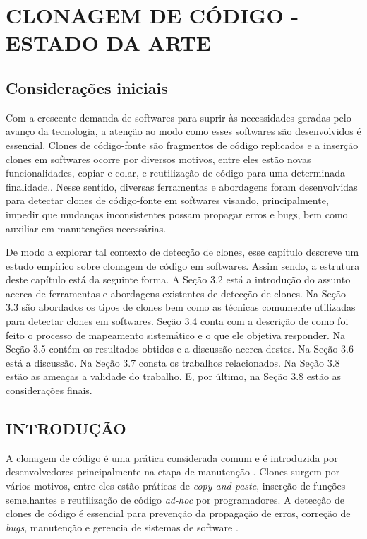\chapter{CLONAGEM DE CÓDIGO - ESTADO DA ARTE}

\section{Considerações iniciais}

Com a crescente demanda de softwares para suprir às necessidades geradas pelo avanço da tecnologia, a atenção ao modo como esses softwares são desenvolvidos é essencial. Clones de código-fonte são fragmentos de código replicados e a inserção clones em softwares ocorre por diversos motivos, entre eles estão novas funcionalidades, copiar e colar, e reutilização de código para uma determinada finalidade\cite{solanki2016comparative}.. Nesse sentido, diversas ferramentas e abordagens foram desenvolvidas para detectar clones de código-fonte em softwares visando, principalmente, impedir que mudanças inconsistentes possam  propagar erros e bugs, bem como auxiliar em manutenções necessárias. 

De modo a explorar tal contexto de detecção de clones, esse capítulo descreve um estudo empírico sobre clonagem de código em softwares. Assim sendo, a estrutura deste capítulo está da seguinte forma. A Seção 3.2 está a introdução do assunto acerca de ferramentas e abordagens existentes de detecção de clones. Na Seção 3.3 são abordados os tipos de clones bem como as técnicas comumente utilizadas para detectar clones em softwares. Seção 3.4 conta com a descrição de como foi feito o processo de mapeamento sistemático e o que ele objetiva responder. Na Seção 3.5 contém os resultados obtidos e a discussão acerca destes. Na Seção 3.6 está a discussão. Na Seção 3.7 consta os trabalhos relacionados. Na Seção 3.8 estão as ameaças a validade do trabalho. E, por último, na Seção 3.8 estão as considerações finais. 

\section{INTRODUÇÃO}
A clonagem de código é uma prática considerada comum e é introduzida por desenvolvedores principalmente na etapa de manutenção \cite{Fordos2016}\cite{Duala-Ekoko2007b}. Clones surgem por vários motivos, entre eles estão práticas de \textit{copy and paste}, inserção de funções semelhantes e reutilização de código \textit{ad-hoc} por programadores. A detecção de clones de código é essencial para prevenção da propagação de erros, correção de \textit{bugs}, manutenção e gerencia de sistemas de software \cite{petersen2008}\cite{solanki2016comparative}.

